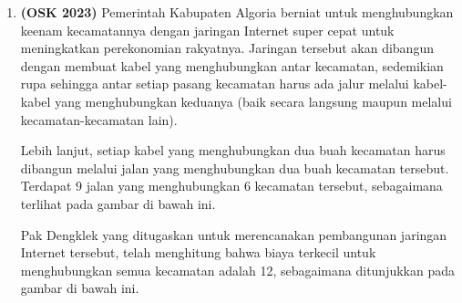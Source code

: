 \documentclass[a4paper]{article}
\begin{document}
\begin{enumerate}
  \item\textbf{(OSK 2023)} Pemerintah Kabupaten Algoria berniat untuk menghubungkan keenam kecamatannya dengan jaringan Internet super cepat untuk meningkatkan perekonomian rakyatnya. Jaringan tersebut akan dibangun dengan membuat kabel yang menghubungkan antar kecamatan, sedemikian rupa sehingga antar setiap pasang kecamatan harus ada jalur melalui kabel-kabel yang menghubungkan keduanya (baik secara langsung maupun melalui kecamatan-kecamatan lain).

  Lebih lanjut, setiap kabel yang menghubungkan dua buah kecamatan harus dibangun melalui jalan yang menghubungkan dua buah kecamatan tersebut. Terdapat 9 jalan yang menghubungkan 6 kecamatan tersebut, sebagaimana terlihat pada gambar di bawah ini.
  
  \begin{center}
  \end{center}
  
  Pak Dengklek yang ditugaskan untuk merencanakan pembangunan jaringan Internet tersebut, telah menghitung bahwa biaya terkecil untuk menghubungkan semua kecamatan adalah 12, sebagaimana ditunjukkan pada gambar di bawah ini.
  
  \begin{center}
\end{center}
\end{enumerate}
\end{document}
